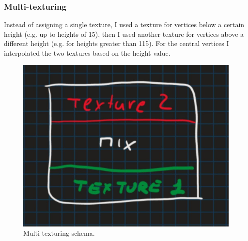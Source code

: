 \begin{figure}[hbt!]
	\centering
	\qquad
	\caption{}
\end{figure}

\newpage

\subsubsection{Multi-texturing}
Instead of assigning a single texture, I used a texture for vertices below a certain height (e.g. up to heights of 15), then I used another texture for vertices above a different height (e.g. for heights greater than 115). For the central vertices I interpolated the two textures based on the height value.

\begin{figure}[hbt!]
	\centering
	\includegraphics[width= 0.45
	\textwidth]{images/textureSchema.jpg}
	\caption{Multi-texturing schema.}
\end{figure} 

\newpage

